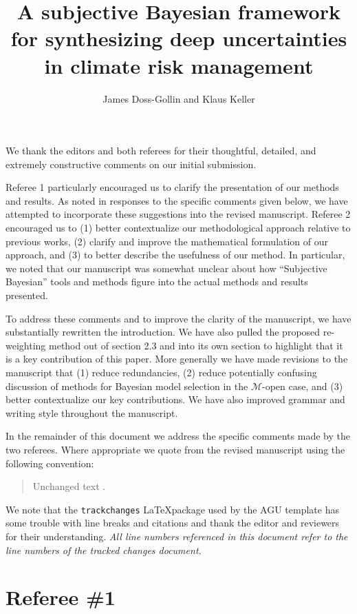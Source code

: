 \documentclass{ar2rc}
\title{A subjective Bayesian framework for synthesizing deep uncertainties in climate risk management}
\author{James Doss-Gollin and Klaus Keller}
\begin{document}
\maketitle

We thank the editors and both referees for their thoughtful, detailed, and extremely constructive comments on our initial submission.

Referee 1 particularly encouraged us to clarify the presentation of our methods and results.
As noted in responses to the specific comments given below, we have attempted to incorporate these suggestions into the revised manuscript.
Referee 2 encouraged us to (1) better contextualize our methodological approach relative to previous works, (2) clarify and improve the mathematical formulation of our approach, and (3) to better describe the usefulness of our method.
In particular, we noted that our manuscript was somewhat unclear about how ``Subjective Bayesian'' tools and methods figure into the actual methods and results presented.

To address these comments and to improve the clarity of the manuscript, we have substantially rewritten the introduction.
We have also pulled the proposed re-weighting method out of section 2.3 and into its own section to highlight that it is a key contribution of this paper.
More generally we have made revisions to the manuscript that (1) reduce redundancies, (2) reduce potentially confusing discussion of methods for Bayesian model selection in the $\mathcal{M}$-open case, and (3) better contextualize our key contributions.
We have also improved grammar and writing style throughout the manuscript.

In the remainder of this document we address the specific comments made by the two referees.
Where appropriate we quote from the revised manuscript using the following convention:
\begin{quote}
    Unchanged text
    \DIFdelbegin {}\DIFdelend \DIFaddbegin {}\DIFaddend.
\end{quote}
We note that the \texttt{trackchanges} \LaTeX package used by the AGU template has some trouble with line breaks and citations and thank the editor and reviewers for their understanding.
\emph{All line numbers referenced in this document refer to the line numbers of the tracked changes document.}

\section{Referee \#1}
\end{document}
